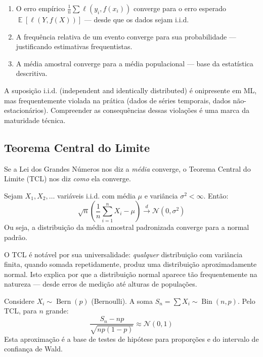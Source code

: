 \documentclass{tufte-handout}
\DeclareMathOperator{\E}{\mathbb{E}}
\DeclareMathOperator{\Bern}{Bern}
\DeclareMathOperator{\Bin}{Bin}
\begin{document}
\begin{enumerate}
    \item O erro empírico $\frac{1}{n}\sum \ell(y_i, f(x_i))$ converge para o erro esperado
    $\E[\ell(Y, f(X))]$ --- desde que os dados sejam i.i.d.
    \item A frequência relativa de um evento converge para sua probabilidade --- justificando
    estimativas frequentistas.
    \item A média amostral converge para a média populacional --- base da estatística descritiva.
\end{enumerate}

A suposição i.i.d. (independent and identically distributed) é onipresente em ML, mas
frequentemente violada na prática (dados de séries temporais, dados não-estacionários).
Compreender as consequências dessas violações é uma marca da maturidade técnica.

\subsection{Teorema Central do Limite}

Se a Lei dos Grandes Números nos diz a \textit{média} converge, o Teorema Central do
Limite (TCL) nos diz \textit{como} ela converge.

\begin{thm}
    Sejam $X_1, X_2, \dots$ variáveis i.i.d. com média $\mu$ e variância $\sigma^2 < \infty$.
    Então:
    \[
    \sqrt{n}\left(\frac{1}{n}\sum_{i=1}^n X_i - \mu\right) \xrightarrow{d} \mathcal{N}(0, \sigma^2)
    \]
    Ou seja, a distribuição da média amostral padronizada converge para a normal padrão.
\end{thm}

O TCL é notável por sua universalidade: \textit{qualquer} distribuição com variância finita,
quando somada repetidamente, produz uma distribuição aproximadamente normal. Isto explica
por que a distribuição normal aparece tão frequentemente na natureza --- desde erros de
medição até alturas de populações.

\begin{exmp}
    Considere $X_i \sim \Bern(p)$ (Bernoulli). A soma $S_n = \sum X_i \sim \Bin(n, p)$.
    Pelo TCL, para $n$ grande:
    \[
    \frac{S_n - np}{\sqrt{np(1-p)}} \approx \mathcal{N}(0, 1)
    \]
    Esta aproximação é a base de testes de hipótese para proporções e do intervalo de
    confiança de Wald.
\end{exmp}
\end{document}

